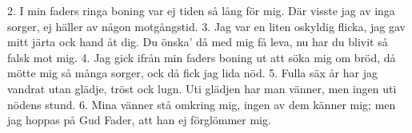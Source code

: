 2.  I min faders ringa boning
    var ej tiden så lång för mig.
    Där visste jag av inga sorger,
    ej häller av någon motgångstid.
3.  Jag var en liten oskyldig flicka,
    jag gav mitt järta ock hand åt dig.
    Du önska’ då med mig få leva,
    nu har du blivit så falsk mot mig.
4.  Jag gick ifrån min faders boning
    ut att söka mig om bröd,
    då mötte mig så många sorger,
    ock då fick jag lida nöd.
5.  Fulla säx år har jag vandrat
    utan glädje, tröst ock lugn.
    Uti glädjen har man vänner,
    men ingen uti nödens stund.
6.  Mina vänner stå omkring mig,
    ingen av dem känner mig;
    men jag hoppas på Gud Fader,
    att han ej förglömmer mig.
